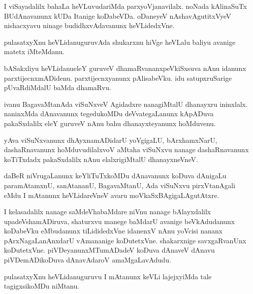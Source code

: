 \begin{mng}
I viSayadalilx bahaLa heVLuvudariMda parxyoVjanavilalx. noNada kAlinaSuTx BUdAnavanunx kUDa Itanige koDabeVDa. oDaneyeV nAshavAgutitxVyeV nishacxyavu ninage budidhxvAdavanunx heVLidedxVne.
\end{mng}

\begin{mng}
pulasatxyXnu heVLidanu\mdash guruvAda shukarxnu hiVge heVLalu baliyu avanige matetx iMteMdanu.
\end{mng}

\begin{mng}
bASakxliyu heVLidanu\mdash eleY guruveV dhamaRvananxpeVkiSxsuva nAnu idanunx parxtijecnxmADidenu. parxtijecnxyanunx pAlisabeVku. idu satupxruSarige pUvaRdiMdalU baMda dhamaRvu.
\end{mng}

\begin{mng}
ivanu BagavaMtanAda viSuNxveV Agidadxre nanagiMtalU dhanayxru ininxlalx. naninxMda dAnavanunx tegedukoMDu deVvategaLanunx kApADuva pakaSxdalilx eleY guruveV nAnu bahu dhanayxteyanunx hoMduvenu.
\end{mng}

\begin{mng}
yAva viSuNxvanunx dhAyxnamADidarU yoVgigaLU, bArxhamxNarU, dashaRnavanunx hoMduvudilalxvoV aMtaha viSuNxvu nanage dashaRnavanunx koTiTxdadx pakaSxdalilx nAnu elalxrigiMtalU dhanayxneVneV. 
\end{mng}

\begin{mng}
daBeR niVrugaLanunx keYliTuTxkoMDu dAnavanunx koDuva dAnigaLu paramAtamxnU, sanAtananU, BagavaMtanU, Ada viSuNxvu pirxVtanAgali eMdu I mAtanunx heVLidareVneV avaru moVkaSxBAgigaLAgutAtxre.
\end{mng}

\begin{mng}
I kelasadalilx nanage saMdeVhabaMdare niVnu nanage bAlayxdalilx upadeVshamADiruva, shaturxvu manege baMdarU avanige beVkAdudanunx koDabeVku eMbudanunx tiLididedxVne idanenxV nAnu yoVcisi nananx pArxNagaLanAnxdarU vAmananige koDutetxVne. shakarxnige savxgaRvanUnx koDutetxVne. piVDeyanunxMTumADadeV koDuva dAnaveV dAnavu piVDemADikoDuva dAnavAdaroV amaMgaLavAdudu.
\end{mng}

\begin{mng}
pulasatxyXnu heVLidanu\mdash guruvu I mAtanunx keVLi lajejxyiMda tale tagigxsikoMDu niMtanu.
\end{mng}

